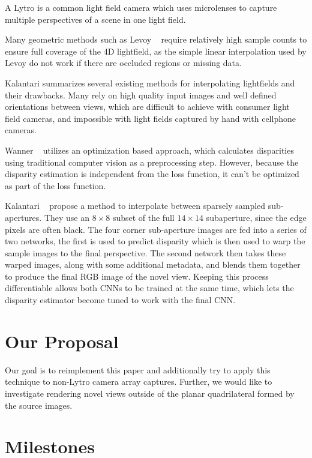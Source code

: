 \documentclass[10pt,twocolumn,letterpaper]{article}
\begin{document}
A Lytro is a common light field camera which uses microlenses to capture multiple
perspectives of a scene in one light field. 

Many geometric methods such as Levoy \etal~\cite{levoy1996light} require relatively high sample counts to ensure full
coverage of the 4D lightfield, as the simple linear interpolation used by Levoy
do not work if there are occluded regions or missing data.

Kalantari summarizes several existing methods for interpolating lightfields and their drawbacks.
Many rely on high quality input images and well defined orientations between views,
which are difficult to achieve with consumer light field cameras, and impossible with light fields
captured by hand with cellphone cameras.

Wanner \etal~\cite{Wanner} utilizes an optimization based approach, which calculates disparities
using traditional computer vision as a preprocessing step. However, because the disparity estimation
is independent from the loss function, it can't be optimized as part of the loss function. 

Kalantari \etal~\cite{LearningViewSynthesis} propose a method to interpolate between 
sparsely sampled sub-apertures. They use an $8 \times 8$ subset of the full $14 \times 14$ subaperture, since the
edge pixels are often black. The four corner sub-aperture images are fed into a series of two 
networks, the first is used to predict disparity which is then used to warp the sample images to the final perspective.
The second network then takes these warped images, along with some additional metadata, and blends them together
to produce the final RGB image of the novel view. Keeping this process differentiable allows both CNNs to 
be trained at the same time, which lets the disparity estimator become tuned to work with the final CNN.

\section{Our Proposal}

Our goal is to reimplement this paper and additionally try to apply this technique to non-Lytro camera
array captures. Further, we would like to investigate rendering novel views outside of the planar
quadrilateral formed by the source images.

\section{Milestones}
\end{document}
